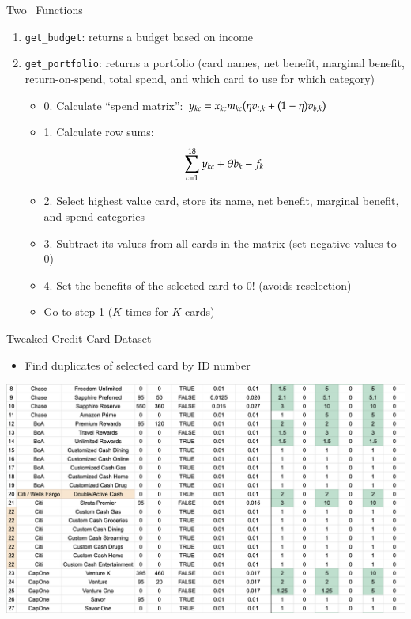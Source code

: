 \begin{frame}{Two \sR\ Functions}
    \begin{enumerate}
        \item \texttt{get\_budget}: returns a budget based on income 
        \item \texttt{get\_portfolio}: returns a portfolio (card names, net benefit, marginal benefit, return-on-spend, total spend, and which card to use for which category) 
        \begin{itemize}
        \item 0. Calculate ``spend matrix'': $y_{kc} = x_{kc}\/m_{kc}( \eta\/ v_{t,k} + 
            (1 - \eta)\/ v_{b,k})$ 
        \item 1. Calculate row sums:
        \[
            \sum_{c=1}^{18} y_{kc} + \theta\/ b_{k} - f_{k}
        \]
        \item 2. Select highest value card, store its name, net benefit, marginal benefit, and spend categories
        \item 3. Subtract its values from all cards in the matrix (set negative values to 0)
        \item 4. Set the benefits of the selected card to 0! (avoids reselection)
        \item Go to step 1 ($K$ times for $K$ cards)
        \end{itemize}
    \end{enumerate}
\end{frame} 



\begin{frame}{Tweaked Credit Card Dataset}
    \begin{itemize}
        \item Find duplicates of selected card by ID number
    \end{itemize}
    \begin{center}
        \includegraphics[width=1\textwidth]{../Misc/CreditCardsUpdate.png}
    \end{center}
\end{frame} 


